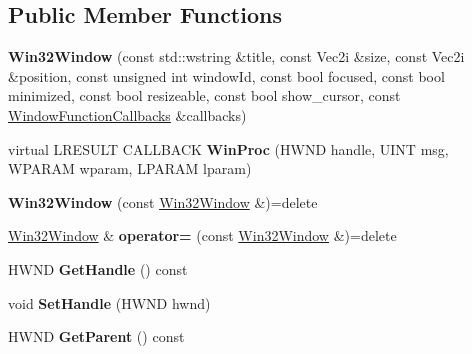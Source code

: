 \subsection*{Public Member Functions}
\begin{DoxyCompactItemize}
\item 
\mbox{\label{class_blade_1_1_win32_window_ab08aba0471e6365bfbb71a908c34998d}} 
{\bfseries Win32\+Window} (const std\+::wstring \&title, const Vec2i \&size, const Vec2i \&position, const unsigned int window\+Id, const bool focused, const bool minimized, const bool resizeable, const bool show\+\_\+cursor, const \hyperlink{struct_blade_1_1_window_function_callbacks}{Window\+Function\+Callbacks} \&callbacks)
\item 
\mbox{\label{class_blade_1_1_win32_window_a7ce1da677c82bf335c119a96e46422f0}} 
virtual L\+R\+E\+S\+U\+LT C\+A\+L\+L\+B\+A\+CK {\bfseries Win\+Proc} (H\+W\+ND handle, U\+I\+NT msg, W\+P\+A\+R\+AM wparam, L\+P\+A\+R\+AM lparam)
\item 
\mbox{\label{class_blade_1_1_win32_window_a7ddf910292d50586c092ddd7e13e57a4}} 
{\bfseries Win32\+Window} (const \hyperlink{class_blade_1_1_win32_window}{Win32\+Window} \&)=delete
\item 
\mbox{\label{class_blade_1_1_win32_window_aecb1108767d664b8df88963c59360f8b}} 
\hyperlink{class_blade_1_1_win32_window}{Win32\+Window} \& {\bfseries operator=} (const \hyperlink{class_blade_1_1_win32_window}{Win32\+Window} \&)=delete
\item 
\mbox{\label{class_blade_1_1_win32_window_a1efeabc0ff6f4c1fb88107e19163bd9e}} 
H\+W\+ND {\bfseries Get\+Handle} () const
\item 
\mbox{\label{class_blade_1_1_win32_window_a92134dabd174c3242780d505b2fba402}} 
void {\bfseries Set\+Handle} (H\+W\+ND hwnd)
\item 
\mbox{\label{class_blade_1_1_win32_window_aa5d969cde3be14cf7ca9df83965343a4}} 
H\+W\+ND {\bfseries Get\+Parent} () const
\item 
\mbox{\label{class_blade_1_1_win32_window_aa5321cb11349a3485778384d1fe6d472}} 

\end{DoxyCompactItemize}
